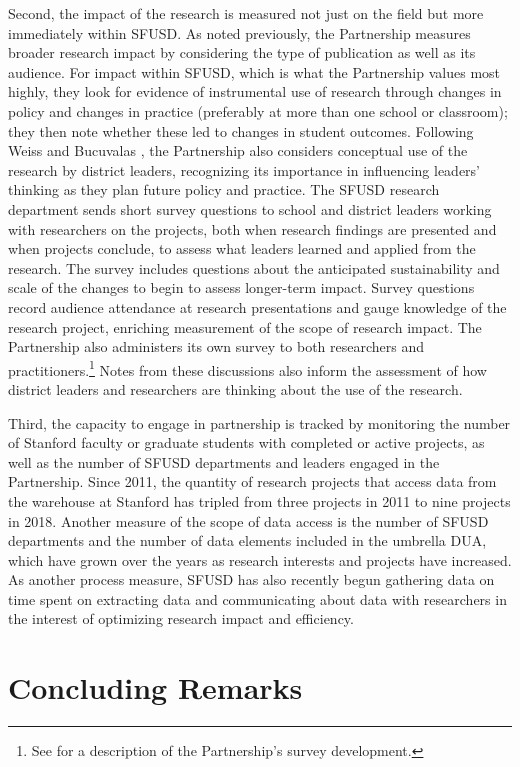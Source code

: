 Second, the impact of the research is measured not just on the field but more immediately within SFUSD. As noted previously, the Partnership measures broader research impact by considering the type of publication as well as its audience. For impact within SFUSD, which is what the Partnership values most highly, they look for evidence of instrumental use of research through changes in policy and changes in practice (preferably at more than one school or classroom); they then note whether these led to changes in student outcomes. Following Weiss and Bucuvalas \citeyearpar{weiss1980}, the Partnership also considers conceptual use of the research by district leaders, recognizing its importance in influencing leaders' thinking as they plan future policy and practice. The SFUSD research department sends short survey questions to school and district leaders working with researchers on the projects, both when research findings are presented and when projects conclude, to assess what leaders learned and applied from the research. The survey includes questions about the anticipated sustainability and scale of the changes to begin to assess longer-term impact. Survey questions record audience attendance at research presentations and gauge knowledge of the research project, enriching measurement of the scope of research impact. The Partnership also administers its own survey to both researchers and practitioners.\footnote{See \citet{wentworth2017} for a description of the Partnership's survey development.} Notes from these discussions also inform the assessment of how district leaders and researchers are thinking about the use of the research.

Third, the capacity to engage in partnership is tracked by monitoring the number of Stanford faculty or graduate students with completed or active projects, as well as the number of SFUSD departments and leaders engaged in the Partnership. Since 2011, the quantity of research projects that access data from the warehouse at Stanford has tripled from three projects in 2011 to nine projects in 2018. Another measure of the scope of data access is the number of SFUSD departments and the number of data elements included in the umbrella DUA, which have grown over the years as research interests and projects have increased. As another process measure, SFUSD has also recently begun gathering data on time spent on extracting data and communicating about data with researchers in the interest of optimizing research impact and efficiency.

\hypertarget{concluding-remarks-1}{%
\section{Concluding Remarks}\label{concluding-remarks-1}}


